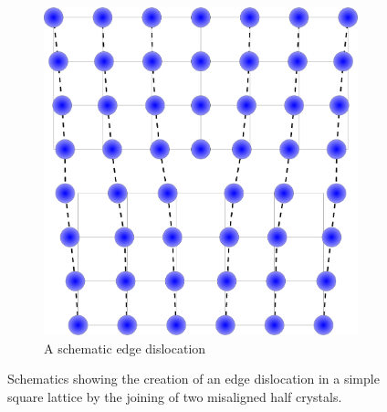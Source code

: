 \begin{figure}
    \begin{subfigure}{0.4\textwidth}
        \includegraphics[width=\textwidth]{Edge_Dislocation}
        \caption{A schematic edge dislocation\label{fig:joined_half_crystals}}
    \end{subfigure}

    \caption{Schematics showing the creation of an edge dislocation in a simple square lattice by the joining of two misaligned half crystals. \label{fig:edge_disloc}}
\end{figure}

